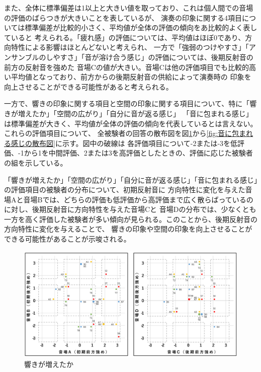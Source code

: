 \documentclass[11pt,a4j]{jreport}
\begin{document}
  また、全体に標準偏差は1以上と大きい値を取っており、これは個人間での音場の評価のばらつきが大きいことを表しているが、
  演奏の印象に関する4項目については標準偏差が比較的小さく、平均値が全体の評価の傾向をあ比較的よく表していると
  考えられる。「疲れ感」の評価については、平均値はほぼ0であり、方向特性による影響はほとんどないと考えられ、
  一方で「強弱のつけやすさ」「アンサンブルのしやすさ」「音が溶け合う感じ」の評価については、後期反射音の前方の反射音を強めた
  音場Cの値が大きい。音場Cは他の評価項目でも比較的高い平均値となっており、前方からの後期反射音の供給によって演奏時の
  印象を向上させることができる可能性があると考えられる。
  
  一方で、響きの印象に関する項目と空間の印象に関する項目について、特に「響きが増えたか」「空間の広がり」「自分に音が返る感じ」
  「音に包まれる感じ」は標準偏差が大きく、平均値が全体の評価の傾向を代表しているとは言えない。これらの評価項目について、
  全被験者の回答の散布図を図\ref{fig:響きが増えたかの散布図}から\ref{fig:音に包まれる感じの散布図}に示す。図中の破線は
  各評価項目について-2または-3を低評価、-1から1を中間評価、2または3を高評価としたときの、評価に応じた被験者の組を示している。
  
  「響きが増えたか」「空間の広がり」「自分に音が返る感じ」「音に包まれる感じ」の評価項目の被験者の分布について、初期反射音に
  方向特性に変化を与えた音場Aと音場Bでは、どちらの評価も低評価から高評価まで広く散らばっているのに対し、後期反射音に方向特性を与えた音場Cと
  音場Dの分布では、少なくとも一方を高く評価した被験者が多い傾向が見られる。このことから、後期反射音の方向特性に変化を与えることで、
  響きの印象や空間の印象を向上させることができる可能性があることが示唆される。

  \begin{figure}[H]
    \centering
    \includegraphics[width=1\linewidth]{images/subjectiveExp/scat01reverb.png}
    \caption{響きが増えたか}
    \label{fig:響きが増えたかの散布図}
  \end{figure}
\end{document}
